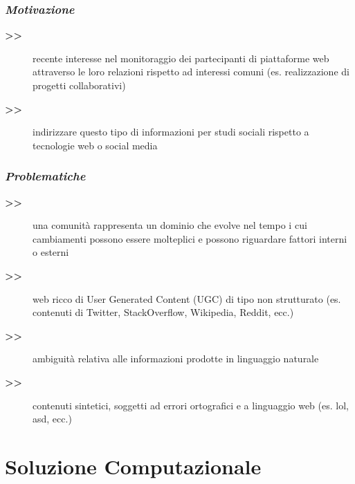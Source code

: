 \documentclass[11pt,xcolor={usenames,dvipsnames,svgnames},compress]{beamer}
\begin{document}
\begin{frame}
  \frametitle{\textcolor{lacamlilac}{\textbf{\emph{Motivazione}}}}
  
  \begin{description}
  \item[\textbf{>>}] recente interesse nel monitoraggio dei partecipanti di piattaforme web attraverso le loro relazioni rispetto ad interessi comuni (es. realizzazione di progetti collaborativi)
  \item[\textbf{>>}] indirizzare questo tipo di informazioni per studi sociali rispetto a tecnologie web o social media
  \end{description}\bigskip  
  
\end{frame}

\begin{frame}
  \frametitle{\textcolor{lacamlilac}{\textbf{\emph{Problematiche}}}}
  
  \begin{description}
    \item[\textbf{>>}] una comunità rappresenta un dominio che evolve nel tempo i cui cambiamenti possono essere molteplici e possono riguardare fattori interni o esterni
  \item[\textbf{>>}] web ricco di User Generated Content (UGC) di tipo non strutturato (es. contenuti di Twitter, StackOverflow, Wikipedia, Reddit, ecc.)
  \item[\textbf{>>}] ambiguit{\`a} relativa alle informazioni prodotte in linguaggio naturale
  \item[\textbf{>>}] contenuti sintetici, soggetti ad errori ortografici e a linguaggio web (es. lol, asd, ecc.)
  \end{description}\bigskip
  
\end{frame}

\section{Soluzione Computazionale}
{
  \begin{frame}
    \sectionpage
  \end{frame}
}
\end{document}
